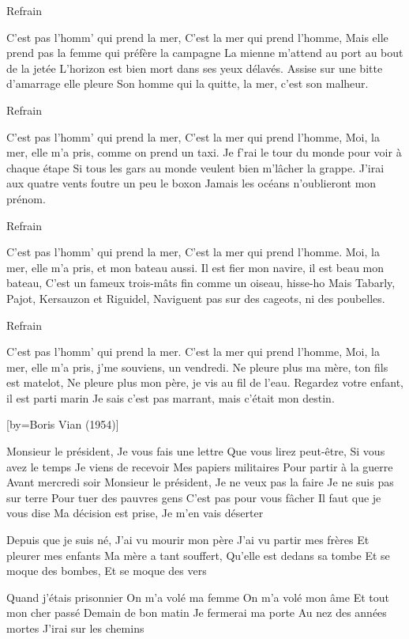 	Refrain

\beginverse
C'est pas l'homm' qui prend la mer, C'est la mer qui prend l'homme,
Mais elle prend pas la femme qui préfère la campagne
La mienne m'attend au port au bout de la jetée
L'horizon est bien mort dans ses yeux délavés.
Assise sur une bitte d'amarrage elle pleure
Son homme qui la quitte, la mer, c'est son malheur.
\endverse

	Refrain

​​C'est pas l'homm' qui prend la mer,
C'est la mer qui prend l'homme,
Moi, la mer, elle m'a pris, comme on prend un taxi.
Je f’rai le tour du monde pour voir à chaque étape
Si tous les gars au monde veulent bien m'lâcher la grappe.
J'irai aux quatre vents foutre un peu le boxon
Jamais les océans n'oublieront mon prénom.

\beginverse
Refrain 
\endverse

\beginverse
C'est pas l'homm' qui prend la mer,
C'est la mer qui prend l’homme.
Moi, la mer, elle m'a pris, et mon bateau aussi.
Il est fier mon navire, il est beau mon bateau,
C'est un fameux trois-mâts fin comme un oiseau, hisse-ho
Mais Tabarly, Pajot, Kersauzon et Riguidel,
Naviguent pas sur des cageots, ni des poubelles.
\endverse

	Refrain

\beginverse
C'est pas l'homm' qui prend la mer.
C'est la mer qui prend l’homme,
Moi, la mer, elle m'a pris, j’me souviens, un vendredi.
Ne pleure plus ma mère, ton fils est matelot,
Ne pleure plus mon père, je vis au fil de l'eau.
Regardez votre enfant, il est parti marin
Je sais c'est pas marrant, mais c'était mon destin.
\endverse

[by={Boris Vian (1954)}]

\beginverse
Monsieur le président,
Je vous fais une lettre
Que vous lirez peut-être,
Si vous avez le temps
Je viens de recevoir
Mes papiers militaires
Pour partir à la guerre
Avant mercredi soir
Monsieur le président,
Je ne veux pas la faire
Je ne suis pas sur terre
Pour tuer des pauvres gens
C'est pas pour vous fâcher
Il faut que je vous dise
Ma décision est prise,
Je m'en vais déserter
\endverse

\beginverse
Depuis que je suis né,
J'ai vu mourir mon père
J'ai vu partir mes frères
Et pleurer mes enfants
Ma mère a tant souffert,
Qu'elle est dedans sa tombe
Et se moque des bombes,
Et se moque des vers
\endverse

\beginverse
Quand j'étais prisonnier
On m'a volé ma femme
On m'a volé mon âme
Et tout mon cher passé
Demain de bon matin
Je fermerai ma porte
Au nez des années mortes
J'irai sur les chemins
\endverse

